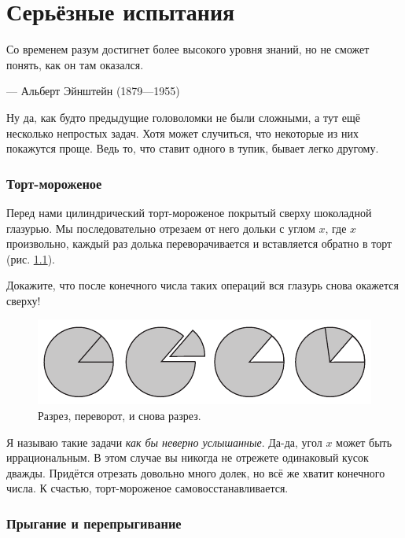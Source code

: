 \chapter{Серьёзные испытания}


\setlength{\epigraphwidth}{.80\textwidth}
\epigraph{Со временем разум достигнет более высокого уровня знаний, но не сможет понять, как он там оказался.
}{--- Альберт Эйнштейн (1879---1955)}

Ну да, как будто предыдущие головоломки не были сложными, а тут ещё несколько непростых задач.
Хотя может случиться, что некоторые из них покажутся проще.
Ведь то, что ставит одного в тупик, бывает легко другому.


\subsection*{Торт-мороженое}\label{Торт-мороженое}

Перед нами цилиндрический торт-мороженое покрытый сверху шоколадной глазурью.
Мы последовательно отрезаем от него дольки с углом $x$, где $x$ произвольно,
каждый раз долька переворачивается и вставляется обратно в торт
(рис. \ref{pic:tort}).

Докажите, что после конечного числа таких операций вся глазурь снова окажется сверху!


\begin{figure}[htb!]
\centering
\includegraphics[scale=1]{pics/tort}
\caption{Разрез, переворот, и снова разрез.}
\label{pic:tort}
\end{figure}

Я называю такие задачи \emph{как бы неверно услышанные}.
Да-да, угол $x$ может быть иррациональным. 
В этом случае вы никогда не отрежете одинаковый кусок дважды.
Придётся отрезать довольно много долек, но всё же хватит конечного числа.
К счастью, торт-мороженое самовосстанавливается.

\subsection*{Прыгание и перепрыгивание}

